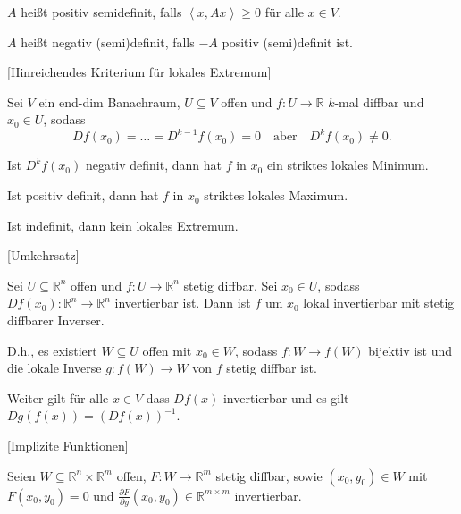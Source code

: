\documentclass[fleqn,draft,a5paper]{article}
\providecommand{\ang}[1]{\left\langle#1\right\rangle}
\theoremstyle{remark}
\begin{document}
\(A\) heißt positiv semidefinit, falls \(\ang{x, Ax} \ge 0\) für alle \(x \in
V\).

\(A\) heißt negativ (semi)definit, falls \(-A\) positiv (semi)definit ist.

[Hinreichendes Kriterium für lokales Extremum]

Sei \(V\) ein end-dim Banachraum, \(U \subseteq V\) offen und \(f\colon U \to \mathbb{R}\) \(k\)-mal
diffbar und \(x_{0} \in U\), sodass
\[Df(x_{0})= \ldots = D^{k-1}f(x_{0})=0 \quad \text{aber} \quad D^{k}f(x_{0}) \ne
  0.\]

Ist \(D^{k}f(x_{0})\) negativ definit, dann hat \(f\) in \(x_{0}\) ein
striktes lokales Minimum.

Ist positiv definit, dann hat \(f\) in \(x_{0}\) striktes lokales Maximum.

Ist indefinit, dann kein lokales Extremum.

[Umkehrsatz]

Sei \(U \subseteq \mathbb{R}^{n}\) offen und
\(f\colon U \to \mathbb{R}^{n}\) stetig diffbar.  Sei \(x_{0} \in U\), sodass
\(Df(x_{0})\colon \mathbb{R}^{n} \to \mathbb{R}^{n}\) invertierbar ist.  Dann ist
\(f\) um \(x_{0}\) lokal invertierbar mit stetig diffbarer Inverser.

D.h., es existiert \(W \subseteq U\) offen mit \(x_{0} \in W\), sodass
\(f\colon W \to f(W)\) bijektiv ist und die lokale Inverse
\(g\colon f(W) \to W\) von \(f\) stetig diffbar ist.

Weiter gilt für alle \(x \in V\) dass \(Df(x)\) invertierbar und es gilt
\(Dg(f(x)) = (Df(x))^{-1}\).

[Implizite Funktionen]

Seien \(W \subseteq \mathbb{R}^{n} \times \mathbb{R}^{m}\) offen, \(F\colon W \to \mathbb{R}^{m}\) stetig diffbar, sowie
\((x_{0}, y_{0}) \in W\) mit \(F(x_{0}, y_{0}) = 0\) und \(\frac{\partial F}{\partial
  y}(x_{0}, y_{0}) \in \mathbb{R}^{m \times m}\) invertierbar.
\end{document}
